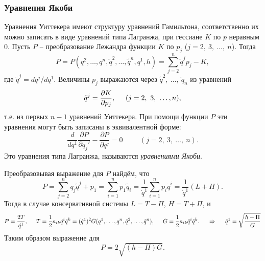 \subsubsection*{Уравнения Якоби}


Уравнения Уиттекера имеют структуру уравнений Гамильтона, соответственно их можно записать в виде уравнений типа Лагранжа, при гессиане $K$ по $p$ неравным 0. Пусть $P$ -- преобразование Лежандра функции $K$ по $p_j$ ($j = 2, \ 3,\ \ldots,\ n$). Тогда
\begin{equation*}
    P = P(q^2, \ldots, q^n, \tilde q^2, \ldots, \tilde q^n, q^1, h) = \sum_{j = 2}^{n} \tilde q^j p_j - K,
\end{equation*}
где $\tilde q^{j} = d q^j / d q^1$. Величины $p_j$ выражаются через $\tilde q^2, \ \ldots, \ \tilde q_n$ из уравнений 
\begin{equation*}
    \tilde q^j = \frac{\partial K}{\partial p_j}, \hspace{0.5cm} 
    (j = 2, \ 3, \ \ldots, n),
\end{equation*}
т.е. из первых $n-1$ уравнений Уиттекера. При помощи функции $P$ эти уравнения могут быть записаны в эквивалентной форме:
\begin{equation*}
    \frac{d }{d q^1} \frac{\partial P}{\partial q_j'} - \frac{\partial P}{\partial q^j} = 0
    \hspace{1cm} (j = 2,\ 3,\ \ldots,\ n).
\end{equation*}
Это уравнения типа Лагранжа, называются \textit{уравнениями Якоби}.

Преобразовывая выражение для $P$ найдём, что
\begin{equation*}
    P = \sum_{j=2}^{n} q_j \tilde q^j + p_1 = 
    \sum_{i=1}^{n} p_1 \tilde q_i = \frac{1}{\dot{q}^1} \sum_{i=1}^{n} p_i \dot{q}^i = \frac{1}{\dot{q}^1} (L+H).
\end{equation*}
Тогда в случае консервативной системы $L = T - \Pi$, $H = T + \Pi$, и
\begin{equation*}
    P = \frac{2T}{\dot{q}^1},
    \hspace{0.5cm} 
    T = \frac{1}{2} a_{ik} \dot{q}^i \dot{q}^k = (\dot{q}^1)^2 G(q^1, \ldots, q^n, \tilde q^2, \ldots, \tilde q^n),
    \hspace{0.5cm} 
    G = \frac{1}{2} a_{ik} \tilde q^i \tilde q^k.
    \hspace{0.5cm} \Rightarrow \hspace{0.5cm} 
    \tilde q^1 = \sqrt{\frac{h-\Pi}{G} }
\end{equation*}
Таким образом выражение для 
\begin{equation*}
    P = 2 \sqrt{(h-\Pi)G }.
\end{equation*}


